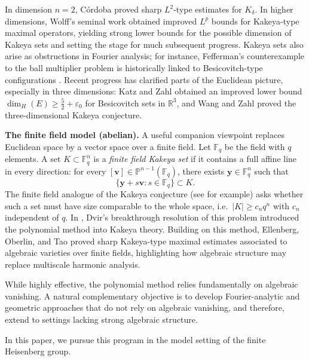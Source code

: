 \documentclass[11pt]{article}
\newcommand{\1}{\mathbf 1}
\begin{document}
In dimension $n=2$, C\'ordoba \cite{Cordoba1977} proved sharp $L^2$-type estimates for $K_\delta$. In higher dimensions, Wolff's seminal work \cite{Wolff1995}
obtained improved $L^p$ bounds for Kakeya-type maximal operators, yielding strong lower bounds
for the possible dimension of Kakeya sets and setting the stage for much subsequent progress. Kakeya sets also arise as obstructions in Fourier analysis; for instance, Fefferman's counterexample to the ball multiplier problem is historically linked to Besicovitch-type configurations \cite{Fefferman1971}. Recent progress has clarified parts of the Euclidean picture, especially in three dimensions: Katz and Zahl \cite{KatzZahl2019} obtained an improved lower bound $\dim_H(E)\ge \frac52+\varepsilon_0$ for Besicovitch sets in $\mathbb{R}^3$, and Wang and Zahl \cite{WangZahl2025} proved the three-dimensional Kakeya conjecture.



\medskip
\noindent\textbf{The finite field model (abelian).}
A useful companion viewpoint replaces Euclidean space by a vector space 
over a finite field. Let $\mathbb{F}_q$ be the field with $q$ elements. 
A set $K \subset \mathbb{F}_q^n$ is a \emph{finite field Kakeya set} if it 
contains a full affine line in every direction: for every $[\mathbf{v}] \in 
\mathbb{P}^{n-1}(\mathbb{F}_q)$, there exists 
$\mathbf{y} \in \mathbb{F}_q^n$ such that
\[
\{\mathbf{y} + s\mathbf{v} : s \in \mathbb{F}_q\} \subset K.
\]
The finite field analogue of the Kakeya conjecture (see \cite{MT04} for example) asks whether such a set must have size comparable to the whole space, i.e.\ $|K| \ge c_n q^n$ with 
$c_n$ independent of $q$. In \cite{Dvir2009}, Dvir's breakthrough resolution of this problem introduced the polynomial method into Kakeya theory. 
Building on this method, Ellenberg, Oberlin, and Tao \cite{EOT} proved sharp Kakeya-type maximal estimates associated to algebraic varieties over finite 
fields, highlighting how algebraic structure may replace multiscale harmonic analysis.

While highly effective, the polynomial method relies fundamentally on algebraic vanishing. A natural complementary objective is to develop Fourier-analytic and geometric approaches that do not rely on algebraic vanishing, and therefore, extend to settings lacking strong algebraic structure.

In this paper, we pursue this program in the model setting of the finite Heisenberg group.
\end{document}
